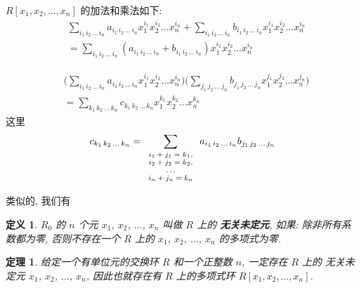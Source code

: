 \documentclass[utf8]{ctexbook}
\newtheorem{theorem}{定理}[section]
\newtheorem{definition}{定义}[section]
\begin{document}
$R[x_1, x_2, \ldots, x_n]$ 的加法和乘法如下:
\begin{align*}
& \sum_{i_1 \, i_2 \, \ldots \, i_n} a_{i_1 \, i_2 \, \ldots \, i_n} x_1 ^{i_1} x_2 ^{i_2} \ldots x_n ^{i_n}
+ \sum_{i_1 \, i_2 \, \ldots \, i_n} b_{i_1 \, i_2 \, \ldots \, i_n} x_1 ^{i_1} x_2 ^{i_2} \ldots x_n ^{i_n} \\
& = \sum_{i_1 \, i_2 \, \ldots \, i_n} ( a_{i_1 \, i_2 \, \ldots \, i_n} + b_{i_1 \, i_2 \, \ldots \, i_n} ) x_1 ^{i_1} x_2 ^{i_2} \ldots x_n ^{i_n}
\end{align*}


\begin{align*}
& \Big( \sum_{i_1 \, i_2 \, \ldots \, i_n} a_{i_1 \, i_2 \, \ldots \, i_n} x_1 ^{i_1} x_2 ^{i_2} \ldots x_n ^{i_n} \Big)
\Big( \sum_{j_1 \, j_2 \, \ldots \, j_n} b_{j_1 \, j_2 \, \ldots \, j_n} x_1 ^{j_1} x_2 ^{j_2} \ldots x_n ^{j_n} \Big) \\
& = \sum_{k_1 \, k_2 \, \ldots \, k_n} c_{k_1 \, k_2 \, \ldots \, k_n} x_1 ^{k_1} x_2 ^{k_2} \ldots x_n ^{k_n}
\end{align*}
这里
\begin{align*}
c_{k_1 \, k_2 \, \ldots \, k_n} = \sum_{\scriptsize
\begin{array}{c}
i_1 + j_1 = k_1, \\
i_2 + j_2 = k_2, \\
\ldots \\
i_n + j_n = k_n
\end{array}
}  a_{i_1 \, i_2 \, \ldots \, i_n} b_{j_1 \, j_2 \, \ldots \, j_n} 
\end{align*}

类似的, 我们有

\begin{definition}
$R_0$ 的 $n$ 个元 $x_1$, $x_2$, $\ldots$, $x_n$ 叫做 $R$ 上的 \textbf{无关未定元}, 如果: 除非所有系数都为零, 否则不存在一个 $R$ 上的 $x_1$, $x_2$, $\ldots$, $x_n$ 的多项式为零.
\end{definition}

\begin{theorem}
给定一个有单位元的交换环 $R$ 和一个正整数 $n$, 一定存在 $R$ 上的 无关未定元 $x_1$, $x_2$, $\ldots$, $x_n$, 因此也就存在有 $R$ 上的多项式环 $R[x_1, x_2, \ldots, x_n]$.
\end{theorem}
\end{document}
